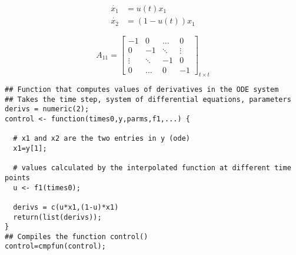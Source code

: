 \documentclass[12pt, oneside]{article}   	%
\begin{document}
\begin{align}
\dot{x_1} & = u(t) x_1 \nonumber \\
\dot{x_2} & = (1-u(t)) x_1 
\end{align}

\begin{equation}
A_{11}=
  \begin{bmatrix}
    -1		& 0 	 	& \ldots 	& 0  	 \\
    0 	 	& -1  	& \ddots 	& \vdots  \\
    \vdots   & \ddots 	& -1		& 0  \\
    0 		& \ldots 	& 0 		& -1  
  \end{bmatrix}_{ t \times t}
\end{equation}

\begin{lstlisting}
## Function that computes values of derivatives in the ODE system
## Takes the time step, system of differential equations, parameters
derivs = numeric(2); 
control <- function(times0,y,parms,f1,...) {
  
  # x1 and x2 are the two entries in y (ode)
  x1=y[1]; 
  
  # values calculated by the interpolated function at different time points
  u <- f1(times0);
  
  derivs = c(u*x1,(1-u)*x1) 
  return(list(derivs));
}
## Compiles the function control()
control=cmpfun(control); 
\end{lstlisting}

\clearpage
\nocite{*}

 

\end{document}
